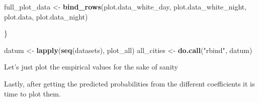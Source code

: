 \documentclass[
]{book}
\newenvironment{Shaded}{\begin{snugshade}}{\end{snugshade}}
\newcommand{\KeywordTok}[1]{\textcolor[rgb]{0.13,0.29,0.53}{\textbf{#1}}}
\newcommand{\NormalTok}[1]{#1}
\newcommand{\StringTok}[1]{\textcolor[rgb]{0.31,0.60,0.02}{#1}}
\begin{document}
\begin{Shaded}
\begin{Highlighting}[]
\NormalTok{  full_plot_data <-}\StringTok{ }\KeywordTok{bind_rows}\NormalTok{(plot.data_white_day, plot.data_white_night, plot.data, plot.data_night)}
  
\NormalTok{\}}

\NormalTok{datum <-}\StringTok{ }\KeywordTok{lapply}\NormalTok{(}\KeywordTok{seq}\NormalTok{(datasets), plot_all)}
\NormalTok{all_cities <-}\StringTok{ }\KeywordTok{do.call}\NormalTok{(}\StringTok{"rbind"}\NormalTok{, datum)}
\end{Highlighting}
\end{Shaded}

Let's just plot the empirical values for the sake of sanity

Lastly, after getting the predicted probabilities from the different coefficients it is time to plot them.
\end{document}
